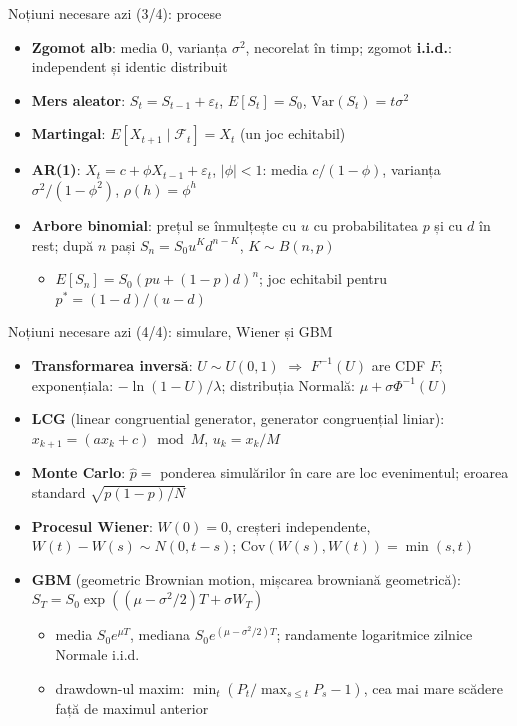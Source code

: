 \begin{frame}{Noțiuni necesare azi (3/4): procese}
\itemsize{\footnotesize}
\begin{itemize}
    \item \textbf{Zgomot alb}: media 0, varianța $\sigma^2$, necorelat în timp; zgomot \textbf{i.i.d.}: independent și identic distribuit
    \item \textbf{Mers aleator}: $S_t = S_{t-1} + \varepsilon_t$, $E[S_t] = S_0$, $\text{Var}(S_t) = t\sigma^2$
    \item \textbf{Martingal}: $E[X_{t+1} \mid \mathcal{F}_t] = X_t$ (un joc echitabil)
    \item \textbf{AR(1)}: $X_t = c + \phi X_{t-1} + \varepsilon_t$, $|\phi| < 1$: media $c/(1 - \phi)$, varianța $\sigma^2/(1 - \phi^2)$, $\rho(h) = \phi^h$
    \item \textbf{Arbore binomial}: prețul se înmulțește cu $u$ cu probabilitatea $p$ și cu $d$ în rest; după $n$ pași $S_n = S_0u^Kd^{n-K}$, $K \sim B(n, p)$
    \begin{itemize}
        \item $E[S_n] = S_0(pu + (1 - p)d)^n$; joc echitabil pentru $p^* = (1 - d)/(u - d)$
    \end{itemize}
\end{itemize}
\end{frame}

\begin{frame}{Noțiuni necesare azi (4/4): simulare, Wiener și GBM}
\itemsize{\footnotesize}
\begin{itemize}
    \item \textbf{Transformarea inversă}: $U \sim U(0, 1)$ $\Rightarrow$ $F^{-1}(U)$ are CDF $F$; exponențiala: $-\ln(1 - U)/\lambda$; distribuția Normală: $\mu + \sigma\Phi^{-1}(U)$
    \item \textbf{LCG} (linear congruential generator, generator congruențial liniar): $x_{k+1} = (ax_k + c) \bmod M$, $u_k = x_k/M$
    \item \textbf{Monte Carlo}: $\hat p = $ ponderea simulărilor în care are loc evenimentul; eroarea standard $\sqrt{p(1 - p)/N}$
    \item \textbf{Procesul Wiener}: $W(0) = 0$, creșteri independente, $W(t) - W(s) \sim N(0, t - s)$; $\text{Cov}(W(s), W(t)) = \min(s, t)$
    \item \textbf{GBM} (geometric Brownian motion, mișcarea browniană geometrică): $S_T = S_0\exp((\mu - \sigma^2/2)T + \sigma W_T)$
    \begin{itemize}
        \item media $S_0e^{\mu T}$, mediana $S_0e^{(\mu - \sigma^2/2)T}$; randamente logaritmice zilnice Normale i.i.d.
        \item drawdown-ul maxim: $\min_t(P_t/\max_{s \le t}P_s - 1)$, cea mai mare scădere față de maximul anterior
    \end{itemize}
\end{itemize}
\end{frame}


